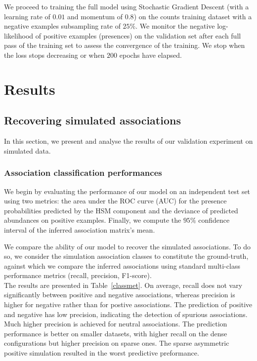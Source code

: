 \documentclass[10pt,a4paper]{article}
\begin{document}
We proceed to training the full model using Stochastic Gradient Descent (with a learning rate of $0.01$ and momentum of $0.8$) on the counts training dataset with a negative examples subsampling rate of $25\%$. We monitor the negative log-likelihood of positive examples (presences) on the validation set after each full pass of the training set to assess the convergence of the training. We stop when the loss stops decreasing or when $200$ epochs have elapsed.

\section{Results}
\subsection{Recovering simulated associations}
In this section, we present and analyse the results of our validation experiment on simulated data.

\subsubsection{Association classification performances}
We begin by evaluating the performance of our model on an independent test set using two metrics: the area under the ROC curve (AUC) for the presence probabilities predicted by the HSM component and the deviance of predicted abundances on positive examples. Finally, we compute the $95\%$ confidence interval of the inferred association matrix's mean. \\

We compare the ability of our model to recover the simulated associations. To do so, we consider the simulation association classes to constitute the ground-truth, against which we compare the inferred associations using standard multi-class performance metrics (recall, precision, F1-score). \\  

The results are presented in Table~\ref{classmet}.
On average, recall does not vary significantly between positive and negative associations, whereas precision is higher for negative rather than for postive associations. The prediction of positive and negative has low precision, indicating the detection of spurious associations. Much higher precision is achieved for neutral associations. The prediction performance is better on smaller datasets, with higher recall on the dense configurations but higher precision on sparse ones. The sparse asymmetric positive simulation resulted in the worst predictive preformance. \\
\end{document}
